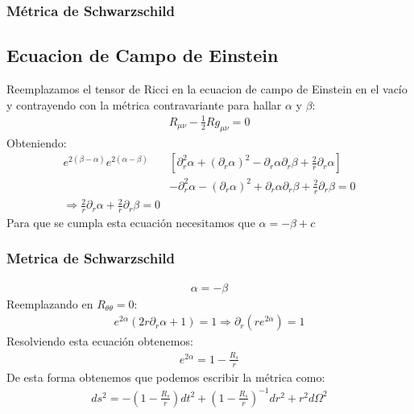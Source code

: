 \documentclass{beamer}
\begin{document}
\begin{frame}
\frametitle{Métrica de Schwarzschild}
\subsection{Ecuacion de Campo de Einstein}

Reemplazamos el tensor de Ricci en la ecuacion de campo de Einstein en el vacío y contrayendo con la métrica contravariante para hallar $ \alpha  $ y $ \beta  $: 
\begin{gather*}
  R _{\mu \nu }  - \frac{1}{2} R g _{\mu \nu }  = 0  
\end{gather*}
Obteniendo: 
\begin{align*}
  e ^ {2 (\beta - \alpha )} e ^ {2 (\alpha - \beta )} &\left[\partial_r^2 \alpha + (\partial_r \alpha )^2 - \partial_r \alpha \partial_r \beta + \frac{2 }{r } \partial_r \alpha \right] \\ 
  &- \partial_r^2 \alpha - (\partial_r \alpha)^2 + \partial_r \alpha \partial_r \beta + \frac{2}{r} \partial_r \beta = 0 \\ 
  \Longrightarrow \frac{2 }{r } \partial_r \alpha + \frac{2 }{r } \partial_r \beta = 0 
\end{align*}
Para que se cumpla esta ecuación necesitamos que $ \alpha = - \beta + c  $
\end{frame}




\begin{frame}
\frametitle{Metrica de Schwarzschild}

\begin{gather*}
  \alpha = - \beta  
\end{gather*}
Reemplazando en $ R _{\theta \theta }  = 0  $: 
\begin{gather*}
  e ^ {2\alpha }(2r \partial_r \alpha + 1 ) = 1 \Longrightarrow \partial_r (r e ^ {2\alpha }) = 1 
\end{gather*}
Resolviendo esta ecuación obtenemos: 
\begin{gather*}
  e ^ {2\alpha } = 1 - \frac{R_s }{r } 
\end{gather*}
De esta forma obtenemos que podemos escribir la métrica como: 
\begin{gather*}
  ds^2 = - \left(1 - \frac{R_s }{r }\right)dt^2 + \left(1 - \frac{R_s }{r}\right) ^ {-1 } dr^2 + r^2 d \Omega^2  
\end{gather*}
\end{frame}
\end{document}
